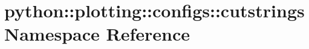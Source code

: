 \hypertarget{namespacepython_1_1plotting_1_1configs_1_1cutstrings}{
\section{python::plotting::configs::cutstrings Namespace Reference}
\label{namespacepython_1_1plotting_1_1configs_1_1cutstrings}
}
